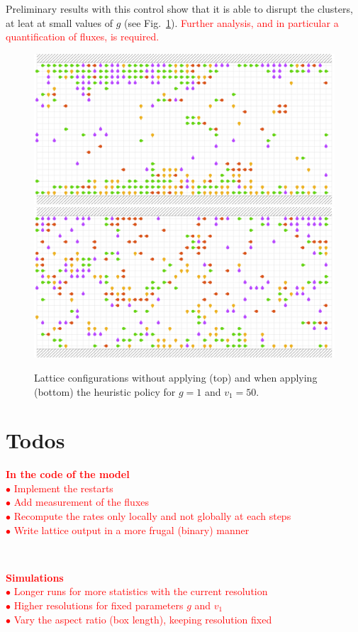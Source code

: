 \documentclass[aps,prl,twocolumn,amsmath,amssymb,superscriptaddress]{revtex4-1}
\newcommand{\obs}[1]{\textcolor{red}{#1}}
\begin{document}
Preliminary results with this control show that it is able to disrupt the clusters, at leat at small values of $g$ (see Fig.~\ref{fig:swarm_channel}). \obs{Further analysis, and in particular a quantification of fluxes, is required.}
\begin{figure}[H]
    \centering
    \includegraphics[width=0.62\linewidth]{swarm_channel_nocontrol}\\[4pt]
    \includegraphics[width=0.62\linewidth]{swarm_channel_control}
    \caption{\label{fig:swarm_channel} Lattice configurations without applying (top) and when applying (bottom) the heuristic policy for $g=1$ and $v_1=50$.}
\end{figure}

\section{Todos}
\noindent\obs{\textbf{In the code of the model}}\\
\obs{$\bullet$ Implement the restarts}\\
\obs{$\bullet$ Add measurement of the fluxes}\\
\obs{$\bullet$ Recompute the rates only locally and not globally at each steps}\\
\obs{$\bullet$ Write lattice output in a more frugal (binary) manner}

\

\noindent\obs{\textbf{Simulations}}\\
\obs{$\bullet$ Longer runs for more statistics with the current resolution}\\
\obs{$\bullet$ Higher resolutions for fixed parameters $g$ and $v_1$}\\
\obs{$\bullet$ Vary the aspect ratio (box length), keeping resolution fixed}
\end{document}
